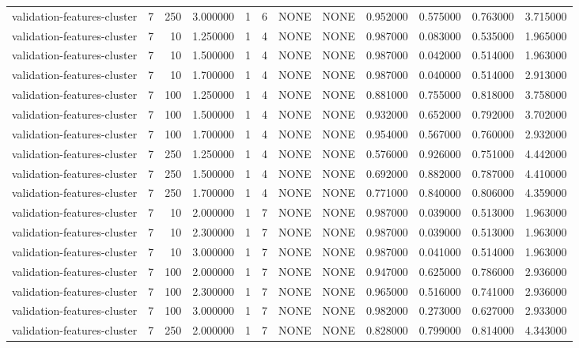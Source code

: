 \begin{tabular}{lrrrllllrrrr}
validation-features-cluster & 7 & 250 & 3.000000 & 1 & 6 & NONE & NONE & 0.952000 & 0.575000 & 0.763000 & 3.715000 \\
validation-features-cluster & 7 & 10 & 1.250000 & 1 & 4 & NONE & NONE & 0.987000 & 0.083000 & 0.535000 & 1.965000 \\
validation-features-cluster & 7 & 10 & 1.500000 & 1 & 4 & NONE & NONE & 0.987000 & 0.042000 & 0.514000 & 1.963000 \\
validation-features-cluster & 7 & 10 & 1.700000 & 1 & 4 & NONE & NONE & 0.987000 & 0.040000 & 0.514000 & 2.913000 \\
validation-features-cluster & 7 & 100 & 1.250000 & 1 & 4 & NONE & NONE & 0.881000 & 0.755000 & 0.818000 & 3.758000 \\
validation-features-cluster & 7 & 100 & 1.500000 & 1 & 4 & NONE & NONE & 0.932000 & 0.652000 & 0.792000 & 3.702000 \\
validation-features-cluster & 7 & 100 & 1.700000 & 1 & 4 & NONE & NONE & 0.954000 & 0.567000 & 0.760000 & 2.932000 \\
validation-features-cluster & 7 & 250 & 1.250000 & 1 & 4 & NONE & NONE & 0.576000 & 0.926000 & 0.751000 & 4.442000 \\
validation-features-cluster & 7 & 250 & 1.500000 & 1 & 4 & NONE & NONE & 0.692000 & 0.882000 & 0.787000 & 4.410000 \\
validation-features-cluster & 7 & 250 & 1.700000 & 1 & 4 & NONE & NONE & 0.771000 & 0.840000 & 0.806000 & 4.359000 \\
validation-features-cluster & 7 & 10 & 2.000000 & 1 & 7 & NONE & NONE & 0.987000 & 0.039000 & 0.513000 & 1.963000 \\
validation-features-cluster & 7 & 10 & 2.300000 & 1 & 7 & NONE & NONE & 0.987000 & 0.039000 & 0.513000 & 1.963000 \\
validation-features-cluster & 7 & 10 & 3.000000 & 1 & 7 & NONE & NONE & 0.987000 & 0.041000 & 0.514000 & 1.963000 \\
validation-features-cluster & 7 & 100 & 2.000000 & 1 & 7 & NONE & NONE & 0.947000 & 0.625000 & 0.786000 & 2.936000 \\
validation-features-cluster & 7 & 100 & 2.300000 & 1 & 7 & NONE & NONE & 0.965000 & 0.516000 & 0.741000 & 2.936000 \\
validation-features-cluster & 7 & 100 & 3.000000 & 1 & 7 & NONE & NONE & 0.982000 & 0.273000 & 0.627000 & 2.933000 \\
validation-features-cluster & 7 & 250 & 2.000000 & 1 & 7 & NONE & NONE & 0.828000 & 0.799000 & 0.814000 & 4.343000 \\

\end{tabular}
